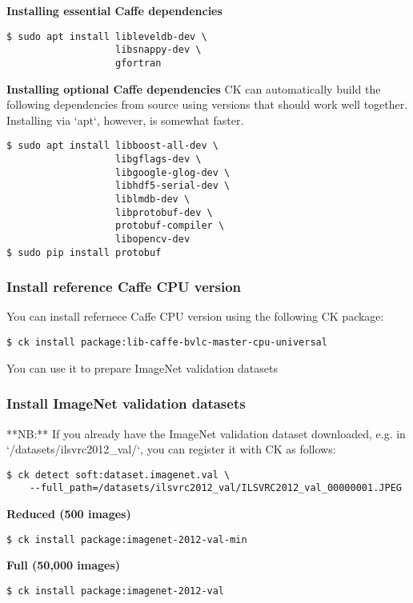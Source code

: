 \documentclass[sigplan]{acmart}
\begin{document}
\textbf{Installing essential Caffe dependencies}
\begin{verbatim}
$ sudo apt install libleveldb-dev \
                   libsnappy-dev \
                   gfortran
\end{verbatim}

\textbf{Installing optional Caffe dependencies}
CK can automatically build the following dependencies from source using versions that should work well together. Installing via `apt`, however, is somewhat faster.

\begin{verbatim}
$ sudo apt install libboost-all-dev \
                   libgflags-dev \
                   libgoogle-glog-dev \
                   libhdf5-serial-dev \
                   liblmdb-dev \
                   libprotobuf-dev \
                   protobuf-compiler \
                   libopencv-dev
$ sudo pip install protobuf
\end{verbatim}

\subsubsection{Install reference Caffe CPU version}

You can install refernece Caffe CPU version using the following CK package:
\begin{verbatim}
$ ck install package:lib-caffe-bvlc-master-cpu-universal
\end{verbatim}

You can use it to prepare ImageNet validation datasets

\subsubsection{Install ImageNet validation datasets}

**NB:** If you already have the ImageNet validation dataset downloaded, e.g. in
`/datasets/ilsvrc2012\_val/`, you can register it with CK as follows:

\begin{verbatim}
$ ck detect soft:dataset.imagenet.val \
    --full_path=/datasets/ilsvrc2012_val/ILSVRC2012_val_00000001.JPEG
\end{verbatim}

\textbf{Reduced (500 images)}
\begin{verbatim}
$ ck install package:imagenet-2012-val-min
\end{verbatim}

\textbf{Full (50,000 images)}
\begin{verbatim}
$ ck install package:imagenet-2012-val
\end{verbatim}
\end{document}
